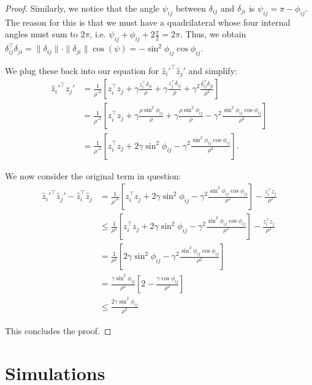 \begin{proof}
    Similarly, we notice that the angle $\psi_{ij}$ between $\delta_{ij}$ and $\delta_{ji}$ is $\psi_{ij} = \pi - \phi_{ij}$. The reason for this is that we must have a quadrilateral whose four internal angles must sum to $2\pi$, i.e. $\psi_{ij} + \phi_{ij} + 2 \frac{\pi}{2} = 2 \pi$. Thus, we obtain $\delta_{ij}^\top \delta_{ji} = \|\delta_{ij}\| \cdot \|\delta_{ji}\| \cos(\psi) = -\sin^2 \phi_{ij} \cos \phi_{ij}$.

    We plug these back into our equation for $\hat{z}_i'^\top \hat{z}_j'$ and simplify:
    \begin{align*}
        \hat{z}_i'^\top \hat{z}_j' &= \frac{1}{\rho'^2}\left[ z_i^\top z_j + \gamma \frac{z_i^\top \delta_{ji}}{\rho} + \gamma \frac{z_j^\top \delta_{ij}}{\rho} + \gamma^2 \frac{\delta_{ij}^\top \delta_{ji}}{\rho^2} \right] \\
        &= \frac{1}{\rho'^2}\left[ z_i^\top z_j + \gamma \frac{\rho \sin^2 \phi_{ij}}{\rho} + \gamma \frac{\rho \sin^2 \phi_{ij}}{\rho} - \gamma^2 \frac{\sin^2 \phi_{ij} \cos \phi_{ij}}{\rho^2} \right] \\
        &= \frac{1}{\rho'^2}\left[ z_i^\top z_j + 2 \gamma \sin^2 \phi_{ij} - \gamma^2 \frac{\sin^2 \phi_{ij} \cos \phi_{ij}}{\rho^2} \right].
    \end{align*}

    We now consider the original term in question:
    \begin{align*}
        \hat{z}_i'^\top \hat{z}_j' - \hat{z}_i^\top \hat{z}_j &= \frac{1}{\rho'^2}\left[ z_i^\top z_j + 2 \gamma \sin^2 \phi_{ij} - \gamma^2 \frac{\sin^2 \phi_{ij} \cos \phi_{ij}}{\rho^2} \right] - \frac{z_i^\top z_j}{\rho^2} \\
        &\leq \frac{1}{\rho^2}\left[ z_i^\top z_j + 2 \gamma \sin^2 \phi_{ij} - \gamma^2 \frac{\sin^2 \phi_{ij} \cos \phi_{ij}}{\rho^2} \right] - \frac{z_i^\top z_j}{\rho^2} \\
        &= \frac{1}{\rho^2}\left[ 2 \gamma \sin^2 \phi_{ij} - \gamma^2 \frac{\sin^2 \phi_{ij} \cos \phi_{ij}}{\rho^2} \right] \\
        &= \frac{\gamma \sin^2 \phi_{ij}}{\rho^2}\left[ 2 - \frac{\gamma \cos \phi_{ij}}{\rho^2} \right]\\
        &\leq \frac{2 \gamma \sin^2 \phi_{ij}}{\rho^2}
    \end{align*}
    
    This concludes the proof.
\end{proof}

\section{Simulations}
\label{app:simulations}

